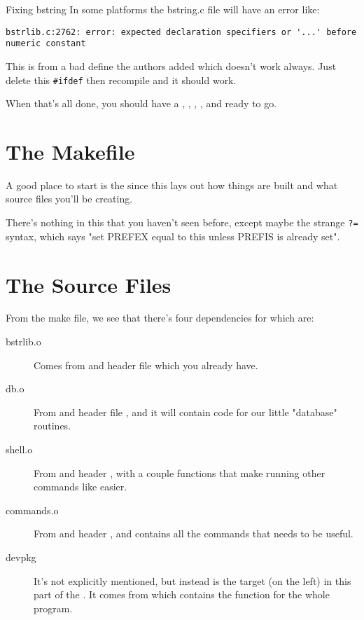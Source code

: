 \begin{aside}{Fixing bstring}
In some platforms the bstring.c file will have an error like:

\begin{lstlisting}
bstrlib.c:2762: error: expected declaration specifiers or '...' before numeric constant
\end{lstlisting}

This is from a bad define the authors added which doesn't work always.  Just
delete this \verb|#ifdef| then recompile and it should work.
\end{aside}

When that's all done, you should have a , ,
, , and  ready to go.

\section{The Makefile}

A good place to start is the  since this lays out 
how things are built and what source files you'll be creating.


There's nothing in this that you haven't seen before, except maybe the strange
\verb|?=| syntax, which says "set PREFEX equal to this unless PREFIS is already
set".

\section{The Source Files}

From the make file, we see that there's four dependencies for 
which are:

\begin{description}
\item[bstrlib.o] Comes from  and header file  which
    you already have.
\item[db.o] From  and header file , and it
    will contain code for our little "database" routines.
\item[shell.o] From  and header , with a couple
    functions that make running other commands like  easier.
\item[commands.o] From  and header , and
    contains all the commands that  needs to be useful.
\item[devpkg] It's not explicitly mentioned, but instead is the target
    (on the left) in this part of the . It comes from
     which contains the  function for the whole
    program.
\end{description}

